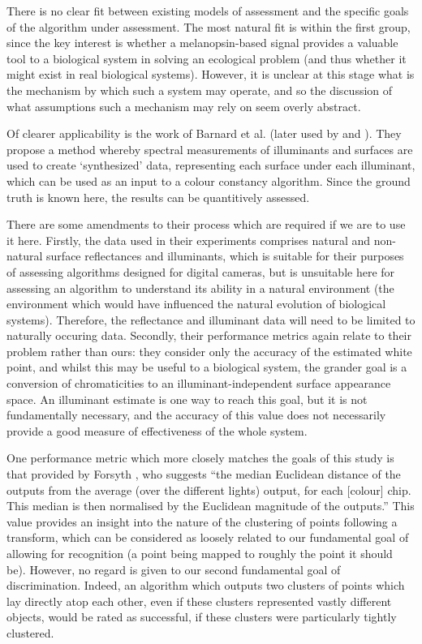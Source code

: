 There is no clear fit between existing models of assessment and the specific goals of the algorithm under assessment. The most natural fit is within the first group, since the key interest is whether a melanopsin-based signal provides a valuable tool to a biological system in solving an ecological problem (and thus whether it might exist in real biological systems). However, it is unclear at this stage what is the mechanism by which such a system may operate, and so the discussion of what assumptions such a mechanism may rely on seem overly abstract.

Of clearer applicability is the work of Barnard et al. \cite{barnard_comparison_2002} (later used by \citet{hordley_reevaluation_2006} and \citet{gijsenij_computational_2011}). They propose a method whereby spectral measurements of illuminants and surfaces are used to create `synthesized' data, representing each surface under each illuminant, which can be used as an input to a colour constancy algorithm. Since the ground truth is known here, the results can be quantitively assessed. 

There are some amendments to their process which are required if we are to use it here. Firstly, the data used in their experiments comprises natural and non-natural surface reflectances and illuminants, which is suitable for their purposes of assessing algorithms designed for digital cameras, but is unsuitable here for assessing an algorithm to understand its ability in a natural environment (the environment which would have influenced the natural evolution of biological systems). Therefore, the reflectance and illuminant data will need to be limited to naturally occuring data. Secondly, their performance metrics again relate to their problem rather than ours: they consider only the accuracy of the estimated white point, and whilst this may be useful to a biological system, the grander goal is a conversion of chromaticities to an illuminant-independent surface appearance space. An illuminant estimate is one way to reach this goal, but it is not fundamentally necessary, and the accuracy of this value does not necessarily provide a good measure of effectiveness of the whole system.

One performance metric which more closely matches the goals of this study is that provided by Forsyth \cite[p.~19]{forsyth_novel_1990}, who suggests ``the median Euclidean distance of the outputs from the average (over the different lights) output, for each [colour] chip. This median is then normalised by the Euclidean magnitude of the outputs.'' This value provides an insight into the nature of the clustering of points following a transform, which can be considered as loosely related to our fundamental goal of allowing for recognition (a point being mapped to roughly the point it should be). However, no regard is given to our second fundamental goal of discrimination. Indeed, an algorithm which outputs two clusters of points which lay directly atop each other, even if these clusters represented vastly different objects, would be rated as successful, if these clusters were particularly tightly clustered.

